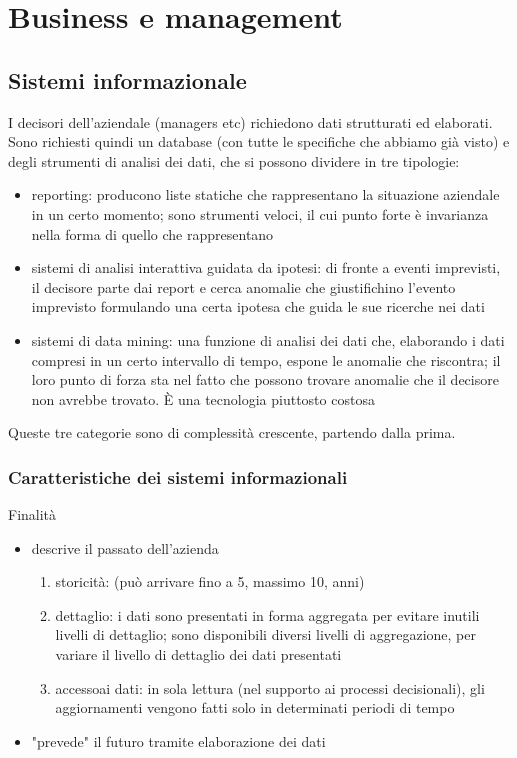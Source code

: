 \chapter{Business e management}
\label{chap:Business e management}

\section{Sistemi informazionale}
\label{sec:Sistemi informazionale}
I decisori dell'aziendale (managers etc) richiedono dati strutturati ed elaborati.
Sono richiesti quindi un database (con tutte le specifiche che abbiamo gi\`a visto) e degli strumenti di analisi dei dati, che si possono dividere in tre tipologie:
\begin{itemize}
  \item reporting: producono liste statiche che rappresentano la situazione aziendale in un certo momento; sono strumenti veloci, il cui punto forte \`e invarianza nella forma di quello che rappresentano
  \item sistemi di analisi interattiva guidata da ipotesi: di fronte a eventi imprevisti, il decisore parte dai report
  e cerca anomalie che giustifichino l'evento imprevisto formulando una certa ipotesa che guida
  le sue ricerche nei dati
  \item sistemi di data mining: una funzione di analisi dei dati che, elaborando i dati compresi in un certo intervallo
  di tempo, espone le anomalie che riscontra; il loro punto di forza sta nel fatto che possono trovare anomalie che
  il decisore non avrebbe trovato. \`E una tecnologia piuttosto costosa
\end{itemize}
Queste tre categorie sono di complessit\`a crescente, partendo dalla prima.

\subsection{Caratteristiche dei sistemi informazionali}
\label{sub:Caratteristiche dei sistemi informazionali}
Finalit\`a
\begin{itemize}
  \item descrive il passato dell'azienda
  \begin{enumerate}
    \item storicit\`a: (pu\`o arrivare fino a 5, massimo 10, anni)
    \item dettaglio: i dati sono presentati in forma aggregata per evitare inutili
    livelli di dettaglio; sono disponibili diversi livelli di aggregazione, per variare
    il livello di dettaglio dei dati presentati
    \item accessoai dati: in sola lettura (nel supporto ai processi decisionali),
    gli aggiornamenti vengono fatti solo in determinati periodi di tempo
  \end{enumerate}
  \item "prevede" il futuro tramite elaborazione dei dati
\end{itemize}
